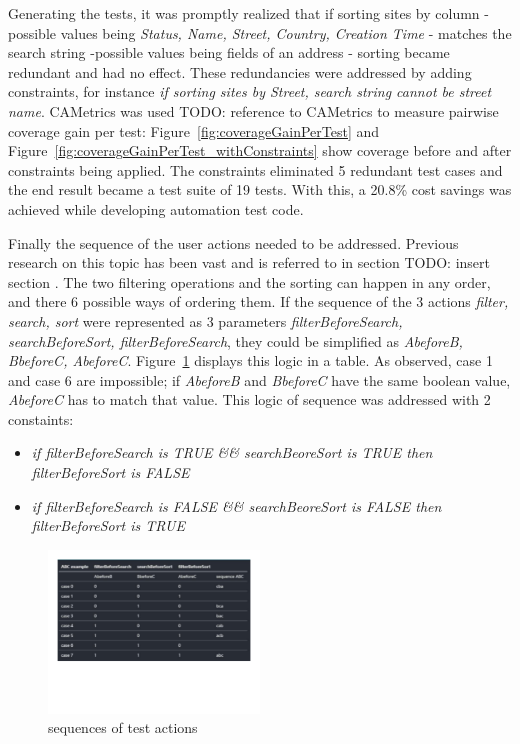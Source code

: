 \documentclass[conference]{IEEEtran}
\newcommand{\todo}[1]{}
\renewcommand{\todo}[1]{{\color{red} TODO: {#1}}}
\begin{document}
	Generating the tests, it was promptly realized that if sorting sites by column - possible values being \textit{Status, Name, Street, Country, Creation Time} - matches the search string -possible values being fields of an address - sorting became redundant and had no effect.
	These redundancies were addressed by adding constraints, for instance \textit{if sorting sites by Street, search string cannot be street name}. 
	CAMetrics was used \todo{reference to CAMetrics} to measure pairwise coverage gain per test: Figure~\ref{fig:coverageGainPerTest} and Figure~\ref{fig:coverageGainPerTest_withConstraints} show coverage before and after constraints being applied.
	The constraints eliminated 5 redundant test cases and the end result became a test suite of 19 tests. With this, a 20.8\% cost savings was achieved while developing automation test code.
	
	Finally the sequence of the user actions needed to be addressed. Previous research on this topic has been vast and is referred to in section \todo{insert section} .
	The two filtering operations and the sorting can happen in any order, and there 6 possible ways of ordering them.
	If the sequence of the 3 actions \textit{filter, search, sort} were represented as 3 parameters \textit{filterBeforeSearch, searchBeforeSort, filterBeforeSearch}, they could be simplified as \textit{AbeforeB, BbeforeC, AbeforeC}.
	Figure~\ref{fig:sorting} displays this logic in a table.
	As observed, case 1 and case 6 are impossible; if \textit{AbeforeB} and \textit{BbeforeC} have the same boolean value, \textit{AbeforeC} has to match that value.
	This logic of sequence was addressed with 2 constaints:

	\begin{itemize}
	\item [] \textit{if filterBeforeSearch is TRUE \&\& searchBeoreSort is TRUE then filterBeforeSort is FALSE}
	\item [] \textit{if filterBeforeSearch is FALSE \&\& searchBeoreSort is FALSE then filterBeforeSort is TRUE}
	\end{itemize}

	\begin{figure}[!t]
		\includegraphics[width=0.50\textwidth,]{sorting.pdf}
		\caption{sequences of test actions}
		\label{fig:sorting}
	\end{figure}
\end{document}
